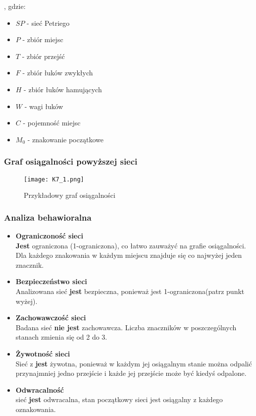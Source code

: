 , gdzie:
\begin{multicols}{2}
	\begin{itemize}[nolistsep]
		\item $SP$ - sieć Petriego
		\item $P$ - zbiór miejsc
		\item $T$ - zbiór przejść
		\item $F$ - zbiór łuków zwykłych
	\end{itemize}
	\columnbreak
	\begin{itemize}[nolistsep]
		\item $H$ - zbiór łuków hamujących
		\item $W$ - wagi łuków
		\item $C$ - pojemność miejsc
		\item $M_0$ - znakowanie początkowe
	\end{itemize}
\end{multicols}

\subsubsection{Graf osiągalności powyższej sieci}

\begin{figure}[H]
	\centering
	\texttt{[image: K7\_1.png]}
	\caption{Przykładowy graf osiągalności}
\end{figure}

\subsubsection{Analiza behawioralna}

\begin{itemize}
	\item \textbf{Ograniczoność sieci} \\
	\textbf{Jest} ograniczona (1-ograniczona), co łatwo zauważyć na grafie osiągalności. Dla każdego znakowania w każdym miejscu znajduje się co najwyżej jeden znacznik. 
	\item \textbf{Bezpieczeństwo sieci} \\
	Analizowana sieć \textbf{jest} bezpieczna, ponieważ jest 1-ograniczona(patrz punkt wyżej).
	\item \textbf{Zachowawczość sieci} \\
	Badana sieć \textbf{nie jest} zachowawcza. Liczba znaczników w poszczególnych stanach zmienia się od 2 do 3.
	\item \textbf{Żywotność sieci} \\
	Sieć z \textbf{jest} żywotna, ponieważ w każdym jej osiągalnym stanie można odpalić przynajmniej jedno przejście i każde jej przejście może być kiedyś odpalone.
	\item \textbf{Odwracalność}  \\
	sieć \textbf{jest} odwracalna, stan początkowy sieci jest osiągalny z każdego oznakowania.
\end{itemize}
